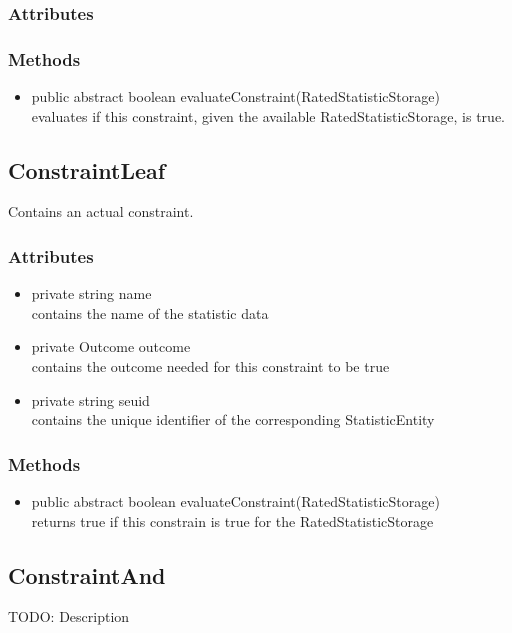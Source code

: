 \subsubsection{Attributes}
\subsubsection{Methods}
\begin{itemize}
	\item public abstract boolean evaluateConstraint(RatedStatisticStorage)\\
	evaluates if this constraint, given the available RatedStatisticStorage, is true. 
\end{itemize}		


\subsection{ConstraintLeaf }
Contains an actual constraint.

\subsubsection{Attributes}
\begin{itemize}
	\item private  string name\\
	contains the name of the statistic data
	\item private  Outcome outcome\\
	contains the outcome needed for this constraint to be true
	\item private  string seuid\\
	contains the unique identifier of the corresponding StatisticEntity
\end{itemize}
\subsubsection{Methods}
\begin{itemize}
	\item public abstract boolean evaluateConstraint(RatedStatisticStorage)\\
	returns true if this constrain is true for the RatedStatisticStorage
\end{itemize}


\subsection{ConstraintAnd }
TODO: Description

